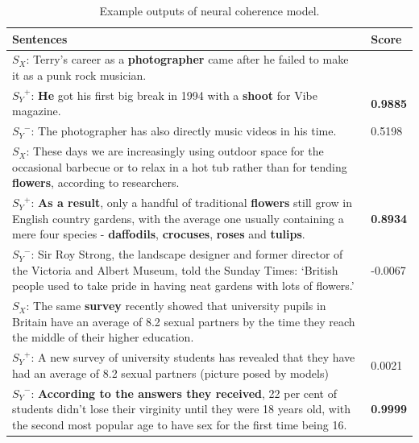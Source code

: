 \documentclass[letterpaper]{article} %
\begin{document}
     \vspace{-15pt}
      \begin{table}[ht]
		\centering
		\caption{Example outputs of neural coherence model.}
		\label{tab:coherence_examples}
		\begin{tabular}{|p{65mm}|p{11mm}|}
			\hline
			 \centering Sentences &  Score \\\hline
			$S_X$: \small{Terry's career as a \textbf{photographer} came after he failed to make it as a punk rock musician.} & \\
			${S_Y}^{+}$: \small{\textbf{He} got his first big break in 1994 with a \textbf{shoot} for Vibe magazine.} & \textbf{0.9885} \\
			${S_Y}^{-}$: \small{The photographer has also directly music videos in his time.} & 0.5198 \\
			 \hline
			 $S_X$: \small{These days we are increasingly using outdoor space for the occasional barbecue or to relax in a hot tub rather than for tending \textbf{flowers}, according to researchers.} & \\
			 ${S_Y}^{+}$: \small{\textbf{As a result}, only a handful of traditional \textbf{flowers} still grow in English country gardens, with the average one usually containing a mere four species - \textbf{daffodils}, \textbf{crocuses}, \textbf{roses} and \textbf{tulips}.} & \textbf{0.8934} \\
			 ${S_Y}^{-}$: \small{Sir Roy Strong, the landscape designer and former director of the Victoria and Albert Museum, told the Sunday Times: `British people used to take pride in having neat gardens with lots of flowers.'} & -0.0067 \\
			\hline
			$S_X$: \small{The same \textbf{survey} recently showed that university pupils in Britain have an average of 8.2 sexual partners by the time they reach the middle of their higher education.} & \\
			${S_Y}^{+}$: \small{A new survey of university students has revealed that they have had an average of 8.2 sexual partners (picture posed by models)} & 0.0021 \\
			${S_Y}^{-}$: \small{\textbf{According to the answers they received}, 22 per cent of students didn't lose their virginity until they were 18 years old, with the second most popular age to have sex for the first time being 16. } & \textbf{0.9999} \\
			\hline
		\end{tabular}
	\end{table}
     \vspace{-15pt}
	
\end{document}

